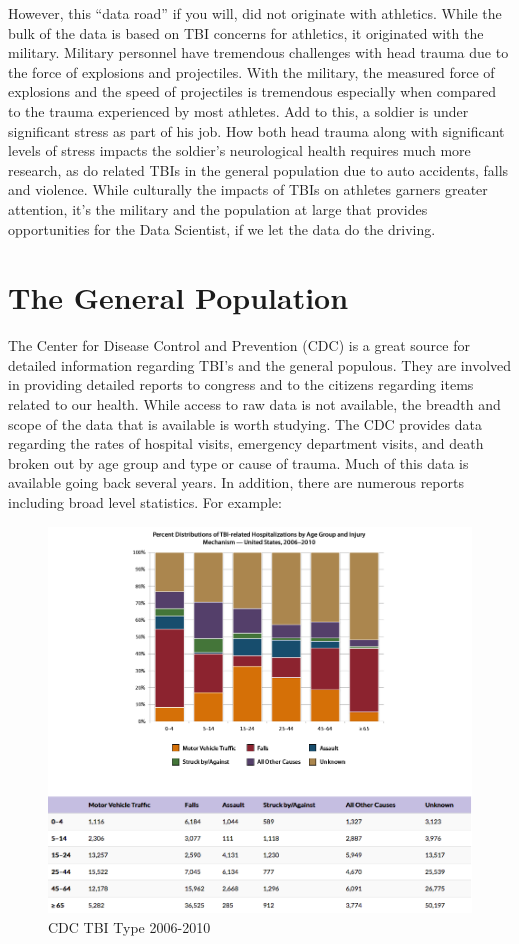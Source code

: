\documentclass[sigconf]{acmart}
\begin{document}
However, this ``data road'' if you will, did not originate with athletics.  While the bulk of the data is based on TBI concerns for athletics, it originated with the military.  Military personnel have tremendous challenges with head trauma due to the force of explosions and projectiles.  With the military, the measured force of explosions and the speed of projectiles is tremendous especially when compared to the trauma experienced by most athletes.  Add to this, a soldier is under significant stress as part of his job.  How both head trauma along with significant levels of stress impacts the soldier's neurological health requires much more research, as do related TBIs in the general population due to auto accidents, falls and violence.  While culturally the impacts of TBIs on athletes garners greater attention, it's the military and the population at large that provides opportunities for the Data Scientist, if we let the data do the driving.  

\section{The General Population}

The Center for Disease Control and Prevention (CDC) is a great source for detailed information regarding TBI's and the general populous.  They are involved in providing detailed reports to congress and to the citizens regarding items related to our health.  While access to raw data is not available, the breadth and scope of the data that is available is worth studying.  The CDC provides data regarding the rates of hospital visits, emergency department visits, and death broken out by age group and type or cause of trauma.  Much of this data is available going back several years.  In addition, there are numerous reports including broad level statistics.  For example:

\begin{figure}[h]
\includegraphics[width=\columnwidth]{images/graph1.png}
\caption{CDC TBI Type 2006-2010}\label{f:CDC TBI Type 2006-2010}
\end{figure}
\end{document}

